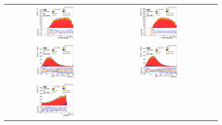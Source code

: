 \begin{figure}[ht]
  \begin{center}
    \begin{tabular}{ccc}
      \includegraphics[width=0.4\textwidth]{figures/tW/fig/MVA_input/ee/H_1j1b_Cll_j1.png}&
      \includegraphics[width=0.4\textwidth]{figures/tW/fig/MVA_input/mumu/H_1j1b_Cll_j1.png}\\
      \includegraphics[width=0.4\textwidth]{figures/tW/fig/MVA_input/ee/H_1j1b_l1_j1_pt.png}&
      \includegraphics[width=0.4\textwidth]{figures/tW/fig/MVA_input/mumu/H_1j1b_l1_j1_pt.png}\\
      \includegraphics[width=0.4\textwidth]{figures/tW/fig/MVA_input/ee/H_1j1b_dPhi_ll_j1.png}&

\end{tabular}
\end{center}
\end{figure}
